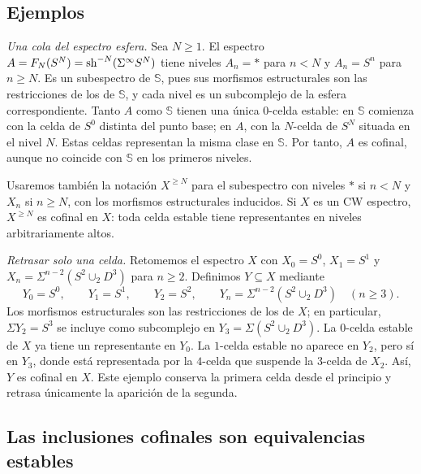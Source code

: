 \subsection{Ejemplos}

\emph{Una cola del espectro esfera.} Sea $N\ge1$. El espectro $A=F_N(S^N)=\operatorname{sh}^{-N}(\Sigma^\infty S^N)$ tiene niveles $A_n=*$ para $n<N$ y $A_n=S^n$ para $n\ge N$. Es un subespectro de $\mathbb S$, pues sus morfismos estructurales son las restricciones de los de $\mathbb S$, y cada nivel es un subcomplejo de la esfera correspondiente. Tanto $A$ como $\mathbb S$ tienen una única $0$-celda estable: en $\mathbb S$ comienza con la celda de $S^0$ distinta del punto base; en $A$, con la $N$-celda de $S^N$ situada en el nivel $N$. Estas celdas representan la misma clase en $\mathbb S$. Por tanto, $A$ es cofinal, aunque no coincide con $\mathbb S$ en los primeros niveles.

Usaremos también la notación $X^{\ge N}$ para el subespectro con niveles $*$ si $n<N$ y $X_n$ si $n\ge N$, con los morfismos estructurales inducidos. Si $X$ es un CW espectro, $X^{\ge N}$ es cofinal en $X$: toda celda estable tiene representantes en niveles arbitrariamente altos.

\emph{Retrasar solo una celda.} Retomemos el espectro $X$ con $X_0=S^0$, $X_1=S^1$ y $X_n=\Sigma^{n-2}(S^2\cup_2D^3)$ para $n\ge2$. Definimos $Y\subseteq X$ mediante
\[
Y_0=S^0,\qquad Y_1=S^1,\qquad Y_2=S^2,\qquad
Y_n=\Sigma^{n-2}(S^2\cup_2D^3)\quad(n\ge3).
\]
Los morfismos estructurales son las restricciones de los de $X$; en particular, $\Sigma Y_2=S^3$ se incluye como subcomplejo en $Y_3=\Sigma(S^2\cup_2D^3)$. La $0$-celda estable de $X$ ya tiene un representante en $Y_0$. La $1$-celda estable no aparece en $Y_2$, pero sí en $Y_3$, donde está representada por la $4$-celda que suspende la $3$-celda de $X_2$. Así, $Y$ es cofinal en $X$. Este ejemplo conserva la primera celda desde el principio y retrasa únicamente la aparición de la segunda.

\subsection{Las inclusiones cofinales son equivalencias estables}

